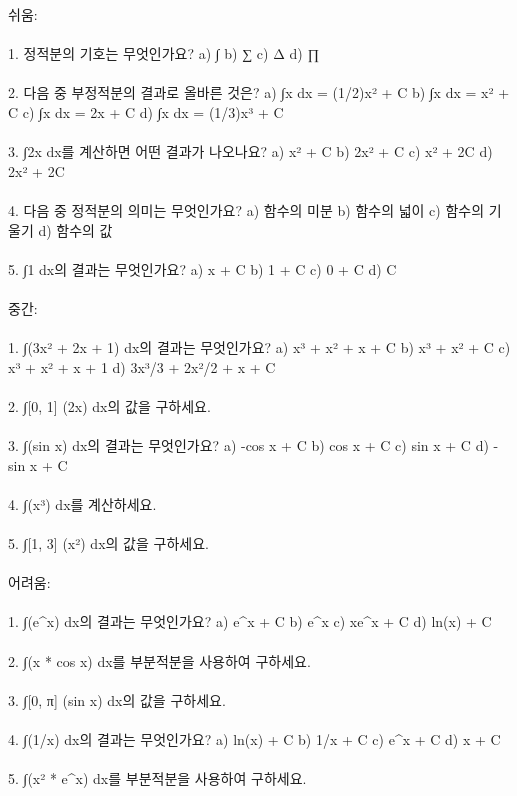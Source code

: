 \documentclass[fleqn]{article}
\begin{document}
      
        쉬움: \\\\  
1. 정적분의 기호는 무엇인가요?  
   a) ∫  
   b) ∑  
   c) Δ  
   d) ∏  
\\\\  
2. 다음 중 부정적분의 결과로 올바른 것은?  
   a) ∫x dx = (1/2)x² + C  
   b) ∫x dx = x² + C  
   c) ∫x dx = 2x + C  
   d) ∫x dx = (1/3)x³ + C  
\\\\  
3. ∫2x dx를 계산하면 어떤 결과가 나오나요?  
   a) x² + C  
   b) 2x² + C  
   c) x² + 2C  
   d) 2x² + 2C  
\\\\  
4. 다음 중 정적분의 의미는 무엇인가요?  
   a) 함수의 미분  
   b) 함수의 넓이  
   c) 함수의 기울기  
   d) 함수의 값  
\\\\  
5. ∫1 dx의 결과는 무엇인가요?  
   a) x + C  
   b) 1 + C  
   c) 0 + C  
   d) C  
\\\\  

중간: \\\\  
1. ∫(3x² + 2x + 1) dx의 결과는 무엇인가요?  
   a) x³ + x² + x + C  
   b) x³ + x² + C  
   c) x³ + x² + x + 1  
   d) 3x³/3 + 2x²/2 + x + C  
\\\\  
2. ∫[0, 1] (2x) dx의 값을 구하세요.  
\\\\  
3. ∫(sin x) dx의 결과는 무엇인가요?  
   a) -cos x + C  
   b) cos x + C  
   c) sin x + C  
   d) -sin x + C  
\\\\  
4. ∫(x³) dx를 계산하세요.  
\\\\  
5. ∫[1, 3] (x²) dx의 값을 구하세요.  
\\\\  

어려움: \\\\  
1. ∫(e^x) dx의 결과는 무엇인가요?  
   a) e^x + C  
   b) e^x  
   c) xe^x + C  
   d) ln(x) + C  
\\\\  
2. ∫(x * cos x) dx를 부분적분을 사용하여 구하세요.  
\\\\  
3. ∫[0, π] (sin x) dx의 값을 구하세요.  
\\\\  
4. ∫(1/x) dx의 결과는 무엇인가요?  
   a) ln(x) + C  
   b) 1/x + C  
   c) e^x + C  
   d) x + C  
\\\\  
5. ∫(x² * e^x) dx를 부분적분을 사용하여 구하세요.  
\\\\  

      
        
\end{document}
